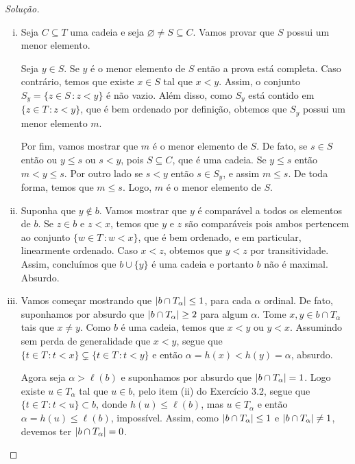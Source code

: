 \documentclass[a4paper]{article}
\begin{document}
  \begin{proof}[Solução]\hfill
    \begin{enumerate}[(i)]
      \item  Seja \(C\subseteq T\) uma cadeia e seja
        \(\varnothing\not = S\subseteq C\). Vamos provar que \(S\) possui um menor
        elemento.

        Seja \(y\in S\). Se \(y\) é o menor elemento de \(S\) então a prova está
        completa. Caso contrário, temos que existe \(x\in S\) tal que \(x<y\). Assim,
         o conjunto \(S_{y} =\{z\in S\,\colon z<y\}\) é não vazio. Além disso, como
         \(S_y\) está contido em \(\{z\in T\,\colon z<y\}\), que é bem ordenado por
         definição, obtemos que \(S_y\) possui um menor elemento \(m\).

         Por fim, vamos mostrar que \(m\) é o menor elemento de \(S\). De fato, se
         \(s\in S\) então ou \(y \leq s\) ou \(s<y\), pois \(S\subseteq C\), que é uma cadeia.
         Se \(y \leq s\) então \(m<y\leq s\). Por outro lado se
         \(s<y\) então \(s\in S_{y}\), e assim \(m\leq s\). De toda forma, temos que
         \(m\leq s\). Logo,  \(m\) é o menor elemento de \(S\).

       \item Suponha que \(y\not\in b\). Vamos mostrar que \(y\) é comparável
        a todos os elementos de \(b\). Se \(z\in b\) e \(z < x\), temos que
        \(y\) e \(z\) são comparáveis pois ambos pertencem ao conjunto \(\{w\in
        T\,\colon w< x \}\), que é bem ordenado, e em particular, linearmente
        ordenado. Caso \(x<z\), obtemos que \(y<z\) por transitividade. Assim,
        concluímos que \(b\cup\{y\}\) é uma cadeia e portanto \(b\) não é
        maximal. Absurdo.

 
        \item Vamos começar mostrando que \(\vert b \cap T_\alpha \vert \leq 1\), para cada
\(\alpha\) ordinal. De fato, suponhamos por absurdo que \(\vert b \cap T_\alpha \vert \geq
2\) para algum \(\alpha\). Tome \(x,y \in b \cap T_\alpha\) tais que \(x \neq
y\). Como \(b\) é uma cadeia, temos que \(x<y\) ou \(y<x\). Assumindo sem perda
de generalidade que \(x < y\), segue que \(\{t \in T\,\colon t < x\} \subsetneq
\{t \in T\,\colon t < y\}\) e então  \(\alpha = h(x) < h(y) = \alpha\), absurdo.

Agora seja \(\alpha > \ell(b)\) e suponhamos por absurdo que \(\vert b \cap T_\alpha \vert = 1\).
Logo existe \(u \in T_\alpha\) tal que \(u \in b\), pelo item (ii) do Exercício
3.2, segue que \(\{t \in T\,\colon t < u\} \subset b\), donde \(h(u) \leq
\ell(b)\), mas \(u \in T_\alpha\) e então \(\alpha = h(u) \leq \ell(b)\), impossível.
Assim, como \(\vert b \cap T_\alpha \vert\leq 1\) e \(\vert b \cap T_\alpha \vert \not
=1\), devemos ter \(\vert b \cap T_\alpha \vert = 0\).


\end{enumerate}
\end{proof}
\end{document}
